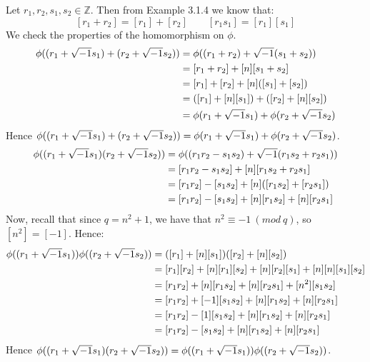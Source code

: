\documentclass{exam}
\begin{document}
\begin{questions}
Let $r_1,r_2,s_1,s_2 \in \mathbb{Z}$. Then from Example 3.1.4 we know that:
\[
[r_1 + r_2] = [r_1] + [r_2] \qquad [r_1s_1] = [r_1][s_1]
\]
We check the properties of the homomorphism on $\phi$.
\begin{align*}
    \phi((r_1 + \sqrt{-1} s_1) + (r_2 + \sqrt{-1} s_2)) &= \phi((r_1 + r_2) + \sqrt{-1} (s_1 + s_2)) \\
                                          &= [r_1 + r_2] + [n][s_1 + s_2] \\
                                          &= [r_1] + [r_2] + [n]([s_1] + [s_2]) \\
                                          &= ([r_1] + [n][s_1]) + ([r_2] + [n][s_2]) \\
                                          &= \phi(r_1 + \sqrt{-1} s_1) + \phi(r_2 + \sqrt{-1} s_2) \\
\end{align*}
Hence $\phi((r_1 + \sqrt{-1} s_1) + (r_2 + \sqrt{-1} s_2)) = \phi(r_1 + \sqrt{-1} s_1) + \phi(r_2 + \sqrt{-1} s_2)$.
\begin{align*}
    \phi((r_1 + \sqrt{-1} s_1)(r_2 + \sqrt{-1} s_2)) &= \phi((r_1r_2 - s_1s_2) + \sqrt{-1} (r_1s_2 + r_2s_1)) \\
                                          &= [r_1r_2 - s_1s_2] + [n][r_1s_2 + r_2s_1] \\
                                          &= [r_1r_2] - [s_1s_2] + [n]([r_1s_2] + [r_2s_1]) \\
                                          &= [r_1r_2] - [s_1s_2] + [n][r_1s_2] + [n][r_2s_1] \\
\end{align*}
Now, recall that since $q = n^2 + 1$, we have that $n^2 \equiv -1 \ (mod \ q)$, so $[n^2] = [-1]$. Hence:
\begin{align*}
    \phi((r_1 + \sqrt{-1} s_1))\phi((r_2 + \sqrt{-1} s_2)) &= ([r_1] + [n][s_1])([r_2] + [n][s_2]) \\
                                             &= [r_1][r_2] + [n][r_1][s_2] +   [n][r_2][s_1] + [n][n][s_1][s_2]  \\
                                             &= [r_1r_2] + [n][r_1s_2] +   [n][r_2s_1] + [n^2][s_1s_2]  \\
                                             &= [r_1r_2] + [-1][s_1s_2]  + [n][r_1s_2] +   [n][r_2s_1]  \\
                                             &= [r_1r_2] - [1][s_1s_2]  + [n][r_1s_2] +   [n][r_2s_1]  \\
                                             &= [r_1r_2] - [s_1s_2]  + [n][r_1s_2] +   [n][r_2s_1]  \\
\end{align*}
Hence $\phi((r_1 + \sqrt{-1} s_1)(r_2 + \sqrt{-1} s_2)) = \phi((r_1 + \sqrt{-1} s_1))\phi((r_2 + \sqrt{-1} s_2))$.


\end{questions}
\end{document}
